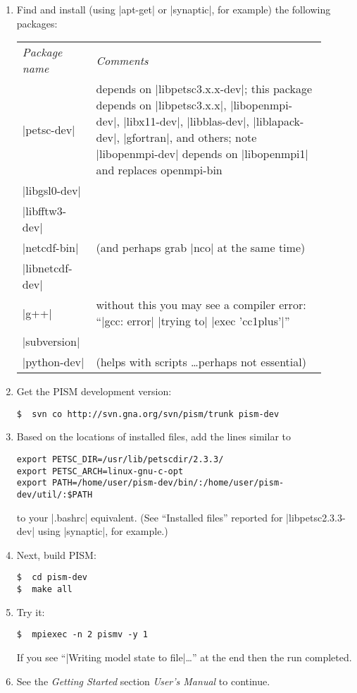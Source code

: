 \documentclass[11pt,final]{amsart}
\begin{document}
\begin{enumerate}
\item Find and install (using |apt-get| or |synaptic|, for example) the following packages:
  \begin{center}
    \begin{tabular*}{0.9\linewidth}{p{0.2\linewidth}p{0.7\linewidth}}
      \hline
      \emph{Package name} & \emph{Comments}\\
      |petsc-dev| & depends on |libpetsc3.x.x-dev|; this package 
      depends on |libpetsc3.x.x|, |libopenmpi-dev|, |libx11-dev|,
      |libblas-dev|, |liblapack-dev|, |gfortran|, and others; 
      note |libopenmpi-dev| depends on |libopenmpi1| and
      replaces openmpi-bin\\
      |libgsl0-dev| & \\
      |libfftw3-dev| & \\
      |netcdf-bin| & (and perhaps grab |nco| at the same time)\\
      |libnetcdf-dev| & \\
      |g++| & without this you may see a compiler error: ``|gcc: error| |trying to| |exec 'cc1plus'|''\\
      |subversion| & \\
      |python-dev| & (helps with scripts \dots perhaps not essential) \\
      \hline
    \end{tabular*}
  \end{center}
\item Get the PISM development version:
\begin{verbatim}
$  svn co http://svn.gna.org/svn/pism/trunk pism-dev
\end{verbatim}
\item Based on the locations of installed files, add the lines similar to
\begin{verbatim}
export PETSC_DIR=/usr/lib/petscdir/2.3.3/
export PETSC_ARCH=linux-gnu-c-opt
export PATH=/home/user/pism-dev/bin/:/home/user/pism-dev/util/:$PATH
\end{verbatim}
to your |.bashrc| equivalent.  (See ``Installed files'' reported for |libpetsc2.3.3-dev| using |synaptic|, for example.)
\item Next, build PISM:
\begin{verbatim}
$  cd pism-dev
$  make all
\end{verbatim}
\item Try it:
\begin{verbatim}
$  mpiexec -n 2 pismv -y 1
\end{verbatim}
If you see ``|Writing model state to file|\dots'' at the end then the run completed.
\item See the \emph{Getting Started} section \emph{User's Manual} to continue.
\end{enumerate}
\end{document}

